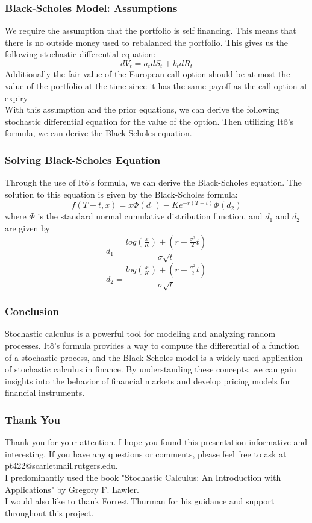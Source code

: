 \documentclass{beamer}
\begin{document}
\begin{frame}
    \frametitle{Black-Scholes Model: Assumptions}
    We require the assumption that the portfolio is self financing. This means that there is no outside money used to rebalanced the portfolio. This gives us the following stochastic differential equation:
    $$dV_t = a_t dS_t + b_t dR_t$$
    Additionally the fair value of the European call option should be at most the value of the portfolio at the time since it has the same payoff as the call option at expiry \\
    With this assumption and the prior equations, we can derive the following stochastic differential equation for the value of the option. 
    Then utilizing Itô's formula, we can derive the Black-Scholes equation.
\end{frame}

\begin{frame}
    \frametitle{Solving Black-Scholes Equation}
    Through the use of Itô's formula, we can derive the Black-Scholes equation. The solution to this equation is given by the Black-Scholes formula:
    $$f(T-t,x) = x \Phi(d_1) - K e^{-r(T-t)} \Phi(d_2)$$
    where $\Phi$ is the standard normal cumulative distribution function, and $d_1$ and $d_2$ are given by
    $$d_1 = \frac{log(\frac{x}{K}) + (r+\frac{\sigma^2}{2}t)}{\sigma \sqrt{t}}$$
    $$d_2 = \frac{log(\frac{x}{K}) + (r-\frac{\sigma^2}{2}t)}{\sigma \sqrt{t}}$$
\end{frame}

\begin{frame}
    \frametitle{Conclusion}
    Stochastic calculus is a powerful tool for modeling and analyzing random processes. Itô's formula provides a way to compute the differential of a function of a stochastic process, and the Black-Scholes model is a widely used application of stochastic calculus in finance. By understanding these concepts, we can gain insights into the behavior of financial markets and develop pricing models for financial instruments.
\end{frame}

\begin{frame}
    \frametitle{Thank You}
    Thank you for your attention. I hope you found this presentation informative and interesting. If you have any questions or comments, please feel free to ask at pt422@scarletmail.rutgers.edu.\\
    \vspace{0.5cm}
    I predominantly used the book "Stochastic Calculus: An Introduction with Applications" by Gregory F. Lawler. \\ 
    \vspace{0.5cm}
    I would also like to thank Forrest Thurman for his guidance and support throughout this project.
\end{frame}
\end{document}
